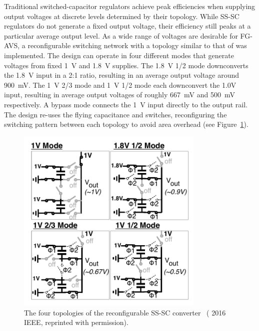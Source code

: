 \documentclass[graybox]{svmult}
\begin{document}
Traditional switched-capacitor regulators achieve peak efficiencies when supplying output voltages at discrete levels determined by their topology.
While SS-SC regulators do not generate a fixed output voltage, their efficiency still peaks at a particular average output level.
As a wide range of voltages are desirable for FG-AVS, a reconfigurable switching network with a topology similar to that of \cite{Le2011} was implemented.
The design can operate in four different modes that generate voltages from fixed \SI{1}{\volt} and \SI{1.8}{\volt} supplies.
The \SI{1.8}{\volt} 1/2 mode downconverts the \SI{1.8}{\volt} input in a 2:1 ratio, resulting in an average output voltage around \SI{900}{\milli\volt}.
The \SI{1}{\volt} 2/3 mode and \SI{1}{\volt} 1/2 mode each downconvert the 1.0V input, resulting in average output voltages of roughly \SI{667}{\milli\volt} and \SI{500}{\milli\volt} respectively.
A bypass mode connects the \SI{1}{\volt} input directly to the output rail.
The design re-uses the flying capacitance and switches, reconfiguring the switching pattern between each topology to avoid area overhead (see Figure~\ref{fig:3-dcdc-topologies}).

\begin{figure}
  \centering
  \includegraphics[width=0.8\textwidth]{3-dcdc-topologies}
  \caption{The four topologies of the reconfigurable SS-SC converter~\cite{Zimmer2016} ({\textcopyright} 2016 IEEE, reprinted with permission).}
  \label{fig:3-dcdc-topologies}
\end{figure}
\end{document}
